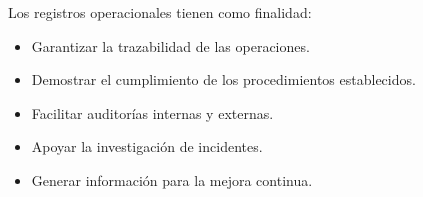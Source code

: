 Los registros operacionales tienen como finalidad:

\begin{itemize}

\item Garantizar la trazabilidad de las operaciones.

\item Demostrar el cumplimiento de los procedimientos establecidos.

\item Facilitar auditorías internas y externas.

\item Apoyar la investigación de incidentes.

\item Generar información para la mejora continua.

\end{itemize}


\renewcommand{\arraystretch}{1.4}

